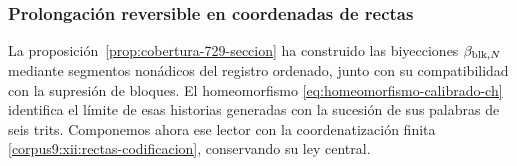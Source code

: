 \subsubsection{Prolongación reversible en coordenadas de rectas}
\label{corpus9:xii:rectas-prolongacion}

La proposición~\ref{prop:cobertura-729-seccion} ha construido las
biyecciones \(\beta_{{\rm blk},N}\) mediante segmentos nonádicos del
registro ordenado, junto con su compatibilidad con la supresión de
bloques. El homeomorfismo
\eqref{eq:homeomorfismo-calibrado-ch} identifica el límite de esas
historias generadas con la sucesión de sus palabras de seis trits.
Componemos ahora ese lector con la coordenatización finita
\eqref{corpus9:xii:rectas-codificacion}, conservando su ley central.

